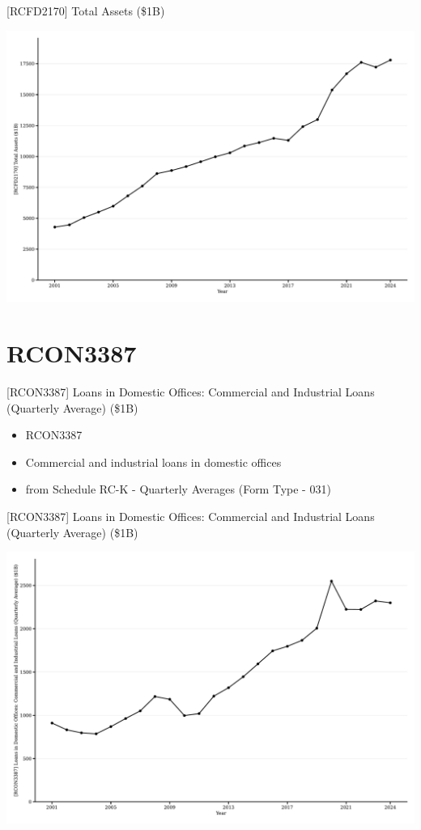 \documentclass{beamer}
\begin{document}
\begin{frame}{[RCFD2170] Total Assets (\$1B)}
\begin{center}
\includegraphics[width=1\textwidth]{figures/Figure_RCFD2170_Total_Assets.pdf} 
\end{center}
\end{frame}


\section{RCON3387}
\begin{frame}{[RCON3387] Loans in Domestic Offices: Commercial and Industrial Loans (Quarterly Average) (\$1B)}
\begin{itemize}
    \item RCON3387
    \item Commercial and industrial loans in domestic offices
    \item from Schedule RC-K - Quarterly Averages (Form Type - 031)
\end{itemize}
\end{frame}

\begin{frame}{[RCON3387] Loans in Domestic Offices: Commercial and Industrial Loans (Quarterly Average) (\$1B)}
\begin{center}
\includegraphics[width=1\textwidth]{figures/Figure_RCON3387_Domestic_Office_CI_Loans.pdf} 
\end{center}
\end{frame}
\end{document}
